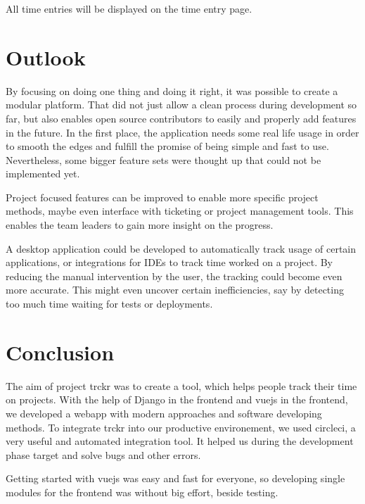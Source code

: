 \documentclass[bibliography=totoc, listof=totocnumbered]{scrartcl}
\begin{document}
All time entries will be displayed on the time entry page.

\section{Outlook}
By focusing on doing one thing and doing it right, it was possible to create a
modular platform. That did not just allow a clean process during development so
far, but also enables open source contributors to easily and properly add
features in the future. In the first place, the application needs some real life
usage in order to smooth the edges and fulfill the promise of being simple and
fast to use. Nevertheless, some bigger feature sets were thought up that could
not be implemented yet.

Project focused features can be improved to enable more specific project
methods, maybe even interface with ticketing or project management tools. This
enables the team leaders to gain more insight on the progress.

A desktop application could be developed to automatically track usage of certain
applications, or integrations for IDEs to track time worked on a project. By
reducing the manual intervention by the user, the tracking could become even
more accurate. This might even uncover certain inefficiencies, say by detecting
too much time waiting for tests or deployments.

\section{Conclusion}
The aim of project trckr was to create a tool, which helps people track their
time on projects. With the help of Django in the frontend and vuejs in the
frontend, we developed a webapp with modern approaches and software developing
methods. To integrate trckr into our productive environement, we used circleci,
a very useful and automated integration tool. It helped us during the development
phase target and solve bugs and other errors.

Getting started with vuejs was easy and fast for everyone, so developing single
modules for the frontend was without big effort, beside testing.

\clearpage
\printbibliography
\end{document}
